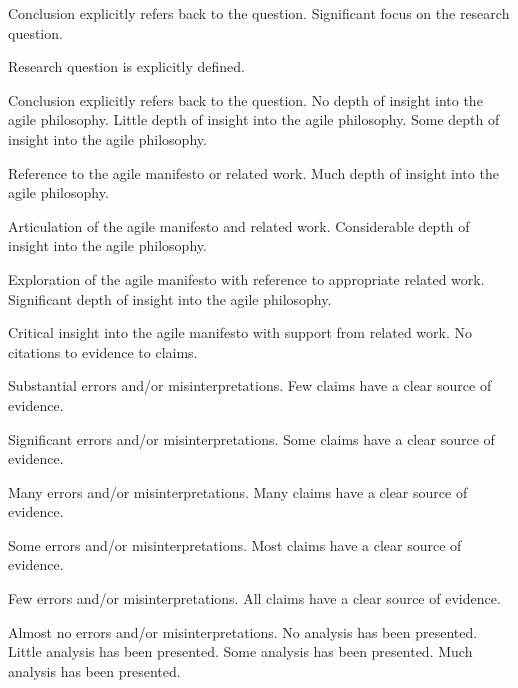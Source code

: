 \documentclass{../fal_assignment}
\begin{document}
\begin{markingrubric}
            \par 		Conclusion explicitly refers back to the question.
        \grade 		Significant focus on the research question.
            \par 		Research question is explicitly defined.
            \par 		Conclusion explicitly refers back to the question.
%
        \grade\fail 	No depth of insight into the agile philosophy.
        \grade 		Little depth of insight into the agile philosophy.
        \grade 		Some depth of insight into the agile philosophy.
        \par 		Reference to the agile manifesto or related work.
        \grade 		Much depth of insight into the agile philosophy.
        \par 		Articulation of the agile manifesto and related work.
        \grade 		Considerable depth of insight into the agile philosophy.
        \par 		Exploration of the agile manifesto with reference to appropriate related work.
        \grade 		Significant depth of insight into the agile philosophy.
        \par 		Critical insight into the agile manifesto with support from related work.
%
        \grade\fail 	No citations to evidence to claims.
        \par 		Substantial errors and/or misinterpretations.
        \grade 		Few claims have a clear source of evidence.
        \par 		Significant errors and/or misinterpretations.
        \grade 		Some claims have a clear source of evidence.
        \par 		Many errors and/or misinterpretations.
        \grade 		Many claims have a clear source of evidence.
        \par 		Some errors and/or misinterpretations.
        \grade 		Most claims have a clear source of evidence.
        \par 		Few errors and/or misinterpretations.
        \grade 		All claims have a clear source of evidence.
        \par 		Almost no errors and/or misinterpretations.
%
        \grade\fail 	No analysis has been presented.
        \grade 		Little analysis has been presented.
        \grade 		Some analysis has been presented. 
        \grade 		Much analysis has been presented.

\end{markingrubric}
\end{document}

